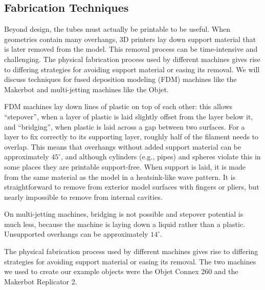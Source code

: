 \subsection{Fabrication Techniques}

Beyond design, the tubes must actually be printable to be useful.  When geometries contain many overhangs, 3D printers lay down support material that is later removed from the model.  This removal process can be time-intensive and challenging.  The physical fabrication process used by different machines gives rise to differing strategies for avoiding support material or easing its removal.  We will discuss techniques for fused deposition modeling (FDM) machines like the Makerbot and multi-jetting machines like the Objet.

FDM machines lay down lines of plastic on top of each other: this allows ``stepover'', when a layer of plastic is laid slightly offset from the layer below it, and ``bridging'', when plastic is laid across a gap between two surfaces.  For a layer to fix correctly to its supporting layer, roughly half of the filament needs to overlap.  This means that overhangs without added support material can be approximately $45^{\circ}$, and although cylinders (e.g., pipes) and spheres violate this in some places they are printable support-free.  When support is laid, it is made from the same material as the model in a heatsink-like wave pattern.  It is straightforward to remove from exterior model surfaces with fingers or pliers, but nearly impossible to remove from internal cavities.

On multi-jetting machines, bridging is not possible and stepover potential is much less, because the machine is laying down a liquid rather than a plastic.  Unsupported overhangs can be approximately $14^{\circ}$.

  
The physical fabrication process used by different machines gives rise to differing strategies for avoiding support material or easing its removal.  The two machines we used to create our example objects were the Objet Connex 260 and the Makerbot Replicator 2.

